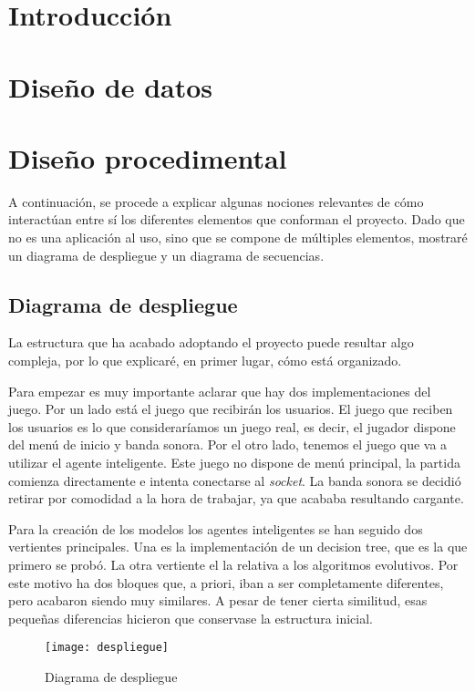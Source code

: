
\section{Introducción}

\section{Diseño de datos}

\section{Diseño procedimental}
A continuación, se procede a explicar algunas nociones relevantes de cómo interactúan entre sí los diferentes elementos que conforman el proyecto. Dado que no es una aplicación al uso, sino que se compone de múltiples elementos, mostraré un diagrama de despliegue y un diagrama de secuencias.

\subsection{Diagrama de despliegue}
La estructura que ha acabado adoptando el proyecto puede resultar algo compleja, por lo que explicaré, en primer lugar, cómo está organizado.

Para empezar es muy importante aclarar que hay dos implementaciones del juego. Por un lado está el juego que recibirán los usuarios. El juego que reciben los usuarios es lo que consideraríamos un juego real, es decir, el jugador dispone del menú de inicio y banda sonora. Por el otro lado, tenemos el juego que va a utilizar el agente inteligente. Este juego no dispone de menú principal, la partida comienza directamente e intenta conectarse al \emph{socket}. La banda sonora se decidió retirar por comodidad a la hora de trabajar, ya que acababa resultando cargante.

Para la creación de los modelos los agentes inteligentes se han seguido dos vertientes principales. Una es la implementación de un decision tree, que es la que primero se probó. La otra vertiente el la relativa a los algoritmos evolutivos. Por este motivo ha dos bloques que, a priori, iban a ser completamente diferentes, pero acabaron siendo muy similares. A pesar de tener cierta similitud, esas pequeñas diferencias hicieron que conservase la estructura inicial.


\begin{figure}
    \centering
    \texttt{[image: despliegue]}
    \caption{Diagrama de despliegue}
    \label{fig:d_desp}
\end{figure}


